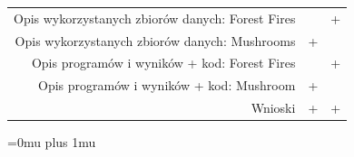 \documentclass[10pt,a4paper]{article}
\begin{document}
\begin{table}[ht]
\begin{tabular}{rcc}
	Opis wykorzystanych zbiorów danych: Forest Fires                  &                      & +                          \\
	Opis wykorzystanych zbiorów danych: Mushrooms                     & +                    & \multicolumn{1}{l}{}       \\
	Opis programów i wyników + kod: Forest Fires                      & \multicolumn{1}{l}{} & +                          \\
	Opis programów i wyników + kod: Mushroom                          & +                    & \multicolumn{1}{l}{}       \\
	Wnioski                                                           & +                    & +                          \\
	\hline
	\end{tabular}
\end{table}

\newpage

\Urlmuskip=0mu plus 1mu\relax
{}

\end{document}
